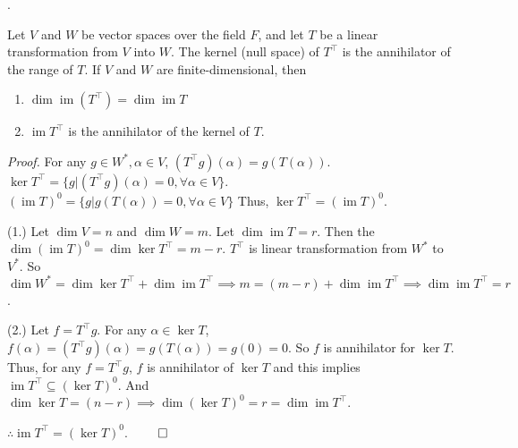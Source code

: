 \documentclass[8pt]{beamer}
\newcommand{\ti}[1]{\textit{#1}}
\newcommand{\im}{\operatorname{im}}
\begin{document}
\begin{frame}{.}
    \begin{theorem}
        Let $V$ and $W$ be vector spaces over the field $F$, and let $T$ be a linear transformation from $V$ into $W$.
        The kernel (null space) of $T^\top$ is the annihilator of the range of $T$.
        If $V$ and $W$ are finite-dimensional, then
        \begin{enumerate}
            \item $\dim \im (T^\top) = \dim \im T$
            \item $\im T^\top$ is the annihilator of the kernel of $T$.
        \end{enumerate}
    \end{theorem}
    \ti{Proof.}
    For any $g \in W^\ast, \alpha \in V$, $(T^\top g)(\alpha) = g(T(\alpha))$.
    $\ker T^\top = \{g | (T^\top g)(\alpha) = 0, \forall \alpha \in V\}$.
    $(\im T)^0 = \{g | g(T(\alpha)) = 0 ,\forall \alpha \in V\}$
    Thus, \underline{$\ker T^\top = (\im T)^0$}.

    (1.) Let $\dim V = n$ and $\dim W = m$.
    Let $\dim \im T = r$.
    Then the $\dim (\im T)^0 = \dim \ker T^\top =  m-r$.
    $T^\top$ is linear transformation from $W^\ast$ to $V^\ast$.
    So $\dim W^\ast = \dim \ker T^\top + \dim \im T^\top \implies m = (m-r) + \dim \im T^\top \implies \dim \im T^\top = r$.
    
    (2.) Let $f = T^\top g$. For any $\alpha \in \ker T$, $f(\alpha) = (T^\top g)(\alpha) = g(T(\alpha)) = g(0) = 0$.
    So $f$ is annihilator for $\ker T$.
    Thus, for any $f = T^\top g$, $f$ is annihilator of $\ker T$ and this implies $\im T^\top \subseteq (\ker T)^0$.
    And $\dim \ker T = (n-r) \implies \dim (\ker T)^0 = r = \dim \im T^\top$.

    $\therefore \im T^\top = (\ker T)^0$.
    $\qed$
\end{frame}
\end{document}
